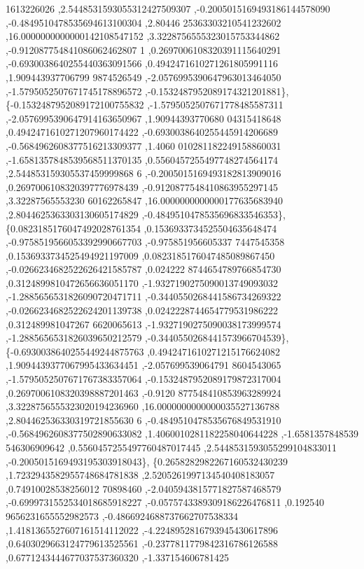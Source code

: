 \begin{DoxyCode}
      1613226026 ,2.5448531593055312427509307 ,-0.2005015169493186144578090 ,-0.4849510478535694613100304 ,2.80446
      25363303210541232602 ,16.0000000000000142108547152 ,3.3228756555323015753344862 ,-0.912087754841086062462807
      1 ,0.2697006108320391115640291 ,-0.6930038640255440363091566 ,0.4942471610271261805991116 ,1.909443937706799
      9874526549 ,-2.0576995390647963013464050 ,-1.5795052507671745178896572 ,-0.1532487952089174321201881\},
\{-0.1532487952089172100755832 ,-1.5795052507671778485587311 ,-2.0576995390647914163650967 ,1.90944393770680
      04315418648 ,0.4942471610271207960174422 ,-0.6930038640255445914206689 ,-0.5684962608377516213309377 ,1.4060
      010281182249158860031 ,-1.6581357848539568511370135 ,0.5560457255497748274564174 ,2.544853159305537459999868
      6 ,-0.2005015169493182813909016 ,0.2697006108320397776978439 ,-0.9120877548410863955297145 ,3.32287565553230
      60162265847 ,16.0000000000000177635683940 ,2.8044625363303130605174829 ,-0.4849510478535696833546353\},
\{0.0823185176047492028761354 ,0.1536933734525504635648474 ,-0.9758519566053392990667703 ,-0.975851956605337
      7447545358 ,0.1536933734525494921197009 ,0.0823185176047485089867450 ,-0.0266234682522626421585787 ,0.024222
      8744654789766854730 ,0.3124899810472656636051170 ,-1.9327190275090013749093032 ,-1.2885656531826090720471711
       ,-0.3440550268441586734269322 ,-0.0266234682522624201139738 ,0.0242228744654779531986222 ,0.312489981047267
      6620065613 ,-1.9327190275090038173999574 ,-1.2885656531826039650212579 ,-0.3440550268441573966704539\},
\{-0.6930038640255449244875763 ,0.4942471610271215176624082 ,1.9094439377067995433634451 ,-2.057699539064791
      8604543065 ,-1.5795052507671767383357064 ,-0.1532487952089179872317004 ,0.2697006108320398887201463 ,-0.9120
      877548410853963289924 ,3.3228756555323020194236960 ,16.0000000000000035527136788 ,2.804462536330319721855630
      6 ,-0.4849510478535676849531910 ,-0.5684962608377502890633082 ,1.4060010281182258040644228 ,-1.6581357848539
      546306909642 ,0.5560457255497760487017445 ,2.5448531593055299104833011 ,-0.2005015169493195303918043\},
\{0.2658282982267160532430239 ,1.7232943582955748684781838 ,2.5205261997134540408183057 ,0.74910028538256012
      70898460 ,-2.0405943815771827587468579 ,-0.6999731552534018685918227 ,-0.0575743389309186226476811 ,0.192540
      9656231655552982573 ,-0.4866924688737662707538334 ,1.4181365527607161514112022 ,-4.2248952816793945430617896
       ,0.6403029663124779613525561 ,-0.2377811779842316786126588 ,0.6771243444677037537360320 ,-1.337154606781425

\end{DoxyCode}

